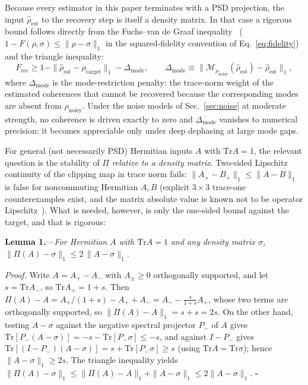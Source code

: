 \documentclass[a4paper,onecolumn]{quantumarticle}
\newcommand{\tr}{\mathrm{Tr}}
\newcommand{\Frec}{F_\mathrm{rec}}
\newcommand{\rhot}{\rho_\mathrm{target}}
\newcommand{\rhon}{\rho_\mathrm{noisy}}
\newcommand{\rhoe}{\hat{\rho}_\mathrm{est}}
\begin{document}
Because every estimator in this paper terminates with a PSD projection, the input $\rhoe$ to the recovery step is itself a density matrix.
In that case a rigorous bound follows directly from the Fuchs--van de Graaf inequality~\cite{FuchsGraaf1999} ($1 - F(\rho,\sigma) \leq \|\rho - \sigma\|_1$ in the squared-fidelity convention of Eq.~\eqref{eq:fidelity}) and the triangle inequality:
\begin{equation}
\Frec \geq 1 - \|\rhoe - \rhot\|_1 - \Delta_{\mathrm{mode}},
\qquad
\Delta_{\mathrm{mode}} \equiv \bigl\|\mathcal{M}_{\rhon}(\rhoe) - \rhoe\bigr\|_1,
\label{eq:fidelity_penalty}
\end{equation}
where $\Delta_{\mathrm{mode}}$ is the mode-restriction penalty: the trace-norm weight of the estimated coherences that cannot be recovered because the corresponding modes are absent from $\rhon$.
Under the noise models of Sec.~\ref{sec:noise} at moderate strength, no coherence is driven exactly to zero and $\Delta_{\mathrm{mode}}$ vanishes to numerical precision; it becomes appreciable only under deep dephasing at large mode gaps.

For general (not necessarily PSD) Hermitian inputs $A$ with $\tr A = 1$, the relevant question is the stability of $\Pi$ \emph{relative to a density matrix}.
Two-sided Lipschitz continuity of the clipping map in trace norm fails: $\|A_+ - B_+\|_1 \leq \|A - B\|_1$ is false for noncommuting Hermitian $A, B$ (explicit $3 \times 3$ trace-one counterexamples exist, and the matrix absolute value is known not to be operator Lipschitz~\cite{Davies1988}).
What is needed, however, is only the one-sided bound against the target, and that is rigorous:

\noindent\textbf{Lemma 1.}---\textit{For Hermitian $A$ with $\tr A = 1$ and any density matrix $\sigma$, $\|\Pi(A) - \sigma\|_1 \leq 2\,\|A - \sigma\|_1$.}

\noindent\textit{Proof.}
Write $A = A_+ - A_-$ with $A_\pm \geq 0$ orthogonally supported, and let $s = \tr A_-$, so $\tr A_+ = 1 + s$.
Then $\Pi(A) - A = A_+/(1+s) - A_+ + A_- = A_- - \tfrac{s}{1+s}A_+$, whose two terms are orthogonally supported, so $\|\Pi(A) - A\|_1 = s + s = 2s$.
On the other hand, testing $A - \sigma$ against the negative spectral projector $P_-$ of $A$ gives $\tr[P_-(A - \sigma)] = -s - \tr[P_-\sigma] \leq -s$, and against $I - P_-$ gives $\tr[(I-P_-)(A-\sigma)] = s + \tr[P_-\sigma] \geq s$ (using $\tr A = \tr\sigma$); hence $\|A - \sigma\|_1 \geq 2s$.
The triangle inequality yields $\|\Pi(A) - \sigma\|_1 \leq \|\Pi(A) - A\|_1 + \|A - \sigma\|_1 \leq 2\|A - \sigma\|_1$. \hfill$\square$
\end{document}
